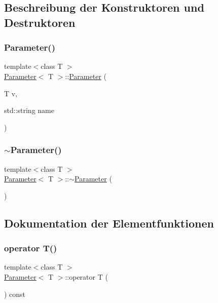 \subsection{Beschreibung der Konstruktoren und Destruktoren}
\hypertarget{class_parameter_a0043f636d495e3cd40686c35b0108059}{}\label{class_parameter_a0043f636d495e3cd40686c35b0108059} 
\subsubsection{\texorpdfstring{Parameter()}{Parameter()}}
{\footnotesize\ttfamily template$<$class T $>$ \\
\hyperlink{class_parameter}{Parameter}$<$ T $>$\+::\hyperlink{class_parameter}{Parameter} (\begin{DoxyParamCaption}\item[{T}]{v,  }\item[{std\+::string}]{name }\end{DoxyParamCaption})}

\hypertarget{class_parameter_a66e9872be5c4d3b49007c5be61ec5620}{}\label{class_parameter_a66e9872be5c4d3b49007c5be61ec5620} 
\subsubsection{\texorpdfstring{$\sim$\+Parameter()}{~Parameter()}}
{\footnotesize\ttfamily template$<$class T $>$ \\
\hyperlink{class_parameter}{Parameter}$<$ T $>$\+::$\sim$\hyperlink{class_parameter}{Parameter} (\begin{DoxyParamCaption}{ }\end{DoxyParamCaption})}



\subsection{Dokumentation der Elementfunktionen}
\hypertarget{class_parameter_acd26e6a88234a14e642bfbcc8e3f5968}{}\label{class_parameter_acd26e6a88234a14e642bfbcc8e3f5968} 
\subsubsection{\texorpdfstring{operator T()}{operator T()}}
{\footnotesize\ttfamily template$<$class T $>$ \\
\hyperlink{class_parameter}{Parameter}$<$ T $>$\+::operator T (\begin{DoxyParamCaption}{ }\end{DoxyParamCaption}) const\hspace{0.3cm}{\ttfamily [inline]}}


